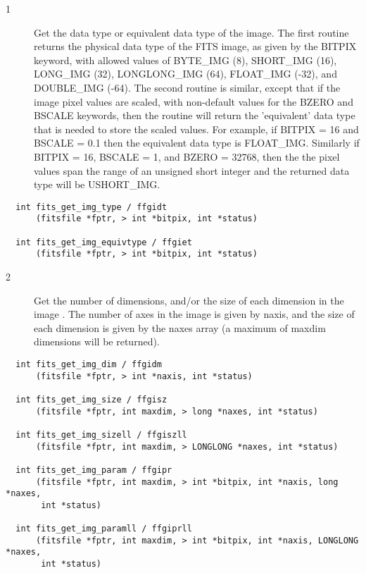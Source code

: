 \documentclass[11pt]{book}
\begin{document}
\begin{description}
\item[1 ] Get the data type or equivalent data type of the image.  The
    first routine returns the physical data type of the FITS image, as
    given by the BITPIX keyword, with allowed values of BYTE\_IMG (8),
    SHORT\_IMG (16), LONG\_IMG (32), LONGLONG\_IMG (64),
    FLOAT\_IMG (-32), and DOUBLE\_IMG
    (-64).
    The second routine is similar, except that if the image pixel
    values are scaled, with non-default values for the BZERO and BSCALE
    keywords, then the routine will return the 'equivalent' data type
    that is needed to store the scaled values.  For example, if BITPIX
    = 16 and BSCALE = 0.1 then the equivalent data type is FLOAT\_IMG.
    Similarly if BITPIX = 16, BSCALE = 1, and BZERO = 32768, then the
    the pixel values span the range of an unsigned short integer and
   the returned data type will be USHORT\_IMG. \label{ffgidt}
\end{description}

\begin{verbatim}
  int fits_get_img_type / ffgidt
      (fitsfile *fptr, > int *bitpix, int *status)

  int fits_get_img_equivtype / ffgiet
      (fitsfile *fptr, > int *bitpix, int *status)
\end{verbatim}

\begin{description}
\item[2 ] Get the number of dimensions, and/or the size of
    each dimension in the image .  The number of axes in the image is
    given by naxis, and the size of each dimension is given by the
    naxes array (a maximum of maxdim dimensions will be returned).
   \label{ffgidm} \label{ffgisz} \label{ffgipr}
\end{description}

\begin{verbatim}
  int fits_get_img_dim / ffgidm
      (fitsfile *fptr, > int *naxis, int *status)

  int fits_get_img_size / ffgisz
      (fitsfile *fptr, int maxdim, > long *naxes, int *status)

  int fits_get_img_sizell / ffgiszll
      (fitsfile *fptr, int maxdim, > LONGLONG *naxes, int *status)

  int fits_get_img_param / ffgipr
      (fitsfile *fptr, int maxdim, > int *bitpix, int *naxis, long *naxes,
       int *status)

  int fits_get_img_paramll / ffgiprll
      (fitsfile *fptr, int maxdim, > int *bitpix, int *naxis, LONGLONG *naxes,
       int *status)
\end{verbatim}
\end{document}
